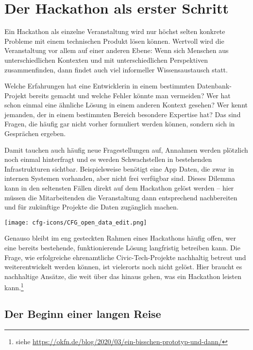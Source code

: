 \chapter{Der Hackathon als erster Schritt}

Ein Hackathon als einzelne Veranstaltung wird nur höchst selten konkrete Probleme mit einem technischen Produkt lösen können. Wertvoll wird die Veranstaltung vor allem auf einer anderen Ebene: Wenn sich Menschen aus unterschiedlichen Kontexten und mit unterschiedlichen Perspektiven zusammenfinden, dann findet auch viel informeller Wissensaustausch statt.

\begin{kaobox}
	Welche Erfahrungen hat eine Entwicklerin in einem bestimmten Datenbank-Projekt bereits gemacht und welche Fehler könnte man vermeiden? Wer hat schon einmal eine ähnliche Lösung in einem anderen Kontext gesehen? Wer kennt jemanden, der in einem bestimmten Bereich besondere Expertise hat? Das sind Fragen, die häufig gar nicht vorher formuliert werden können, sondern sich in Gesprächen ergeben.
\end{kaobox}

Damit tauchen auch häufig neue Fragestellungen auf, Annahmen werden plötzlich noch einmal hinterfragt und es werden Schwachstellen in bestehenden Infrastrukturen sichtbar. Beispielsweise benötigt eine App Daten, die zwar in internen Systemen vorhanden, aber nicht frei verfügbar sind. Dieses Dilemma kann in den seltensten Fällen direkt auf dem Hackathon gelöst werden – hier müssen die Mitarbeitenden die Veranstaltung dann entsprechend nachbereiten und für zukünftige Projekte die Daten zugänglich machen.

\begin{marginfigure}[-5.5cm]
	\texttt{[image: cfg-icons/CFG\_open\_data\_edit.png]}
\end{marginfigure}

Genauso bleibt im eng gesteckten Rahmen eines Hackathons häufig offen, wer eine bereits bestehende, funktionierende Lösung langfristig betreiben kann.
Die Frage, wie erfolgreiche ehrenamtliche Civic-Tech-Projekte nachhaltig betreut und weiterentwickelt werden können, ist vielerorts noch nicht gelöst. Hier braucht es nachhaltige Ansätze, die weit über das hinaus gehen, was ein Hackathon leisten kann.\footnote{siehe \url{https://okfn.de/blog/2020/03/ein-bisschen-prototyp-und-dann/}}

\section*{Der Beginn einer langen Reise}

